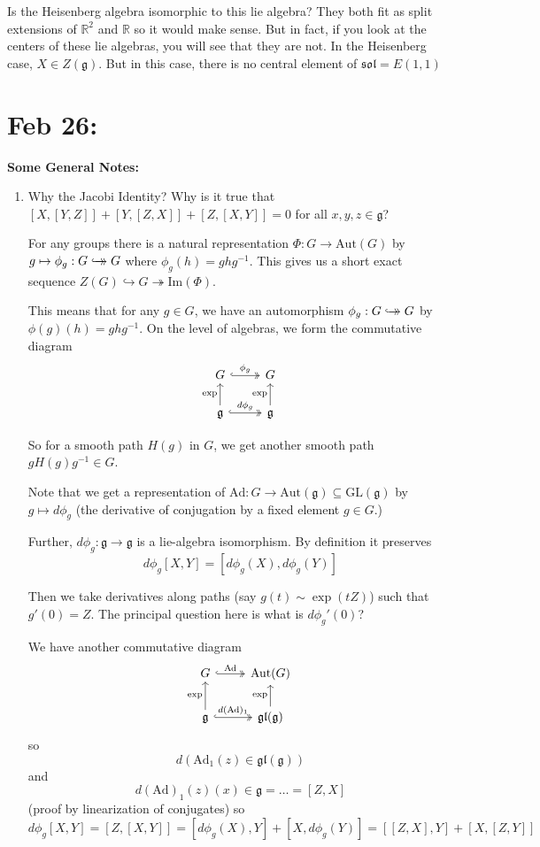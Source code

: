 \documentclass[12pt]{article}
\newcommand{\R}{\mathbb{R}}
\newcommand{\GL}{\text{GL}}
\newcommand{\biject}{\hookrightarrow \hspace{-8pt} \rightarrow}
\newcommand{\g}{\mathfrak{g}}
\newcommand{\gl}{\mathfrak{gl}}
\newcommand{\Aut}{\text{Aut}}
\begin{document}
    Is the Heisenberg algebra isomorphic to this lie algebra? They both fit as split extensions of $\R^2$ and $\R$ so it would make sense. But in fact, if you look at the centers of these lie algebras, you will see that they are not. In the Heisenberg case, $X \in Z(\g)$. But in this case, there is no central element of $\mathfrak{sol} = E(1, 1)$ 
   
\section{Feb 26:}
    \textbf{Some General Notes:}
    \begin{enumerate}
        \item Why the Jacobi Identity? Why is it true that $[X, [Y, Z]] + [Y, [Z, X]] + [Z, [X, Y]] = 0$ for all $x, y, z \in \g$? 
        
        For any groups there is a natural representation $\Phi: G \to \Aut(G)$ by $g \mapsto \phi_g: G \biject G$ where $\phi_g(h) = ghg^{-1}$. This gives us a short exact sequence $Z(G) \hookrightarrow G \twoheadrightarrow \text{Im}(\Phi)$. 

        This means that for any $g \in G$, we have an automorphism $\phi_g: G \biject G$ by $\phi(g)(h) = ghg^{-1}$. On the level of algebras, we form the commutative diagram 
        \[\begin{tikzcd}
            G \arrow[hook, two heads]{r}{\phi_g} & G\\
            \g \arrow{u}{\exp} \arrow[hook, two heads]{r}{d\phi_g} & \g \arrow{u}{\exp}
        \end{tikzcd}\]

        So for a smooth path $H(g)$ in $G$, we get another smooth path $gH(g)g^{-1} \in G$. 

        Note that we get a representation of $\text{Ad}: G \to \Aut(\g) \subseteq \GL(\g)$ by $g \mapsto d\phi_g$ (the derivative of conjugation by a fixed element $g \in G$.)

        Further, $d\phi_g: \g \to \g$ is a lie-algebra isomorphism. By definition it preserves 
        \[d\phi_g[X, Y] = [d\phi_g(X), d\phi_g(Y)]\]

        Then we take derivatives along paths (say $g(t) \sim \exp(tZ)$) such that $g'(0) = Z$. The principal question here is what is $d\phi_g'(0)$? 

        We have another commutative diagram
        \[\begin{tikzcd}
            G \arrow[hook, two heads]{r}{\text{Ad}} & \Aut(G)\\
            \g \arrow{u}{\exp} \arrow[hook, two heads]{r}{d(\text{Ad})_1} & \gl(\g) \arrow{u}{\exp}
        \end{tikzcd}\]
        so 
        \[d(\text{Ad}_1(z) \in \gl(\g))\] 
        and 
        \[d(\text{Ad})_1(z)(x) \in \g = \dots = [Z, X]\]
        (proof by linearization of conjugates) so 
        \[d\phi_g[X, Y] = [Z, [X, Y]] = [d\phi_g(X), Y] + [X, d\phi_g(Y)] = [[Z, X], Y] + [X, [Z, Y]]\]


\end{enumerate}
\end{document}
